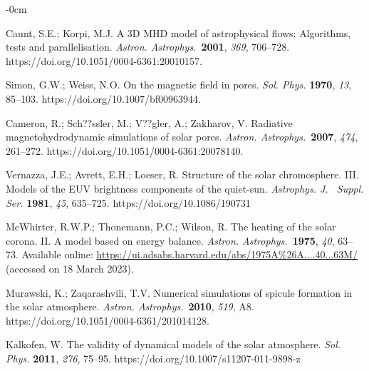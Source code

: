 \documentclass[physics,article,accept,pdftex,moreauthors]{Definitions/mdpi}
\newcommand{\aap}{{\it Astron. Astrophys.}}
\begin{document}
\begin{adjustwidth}{-\extralength}{0cm}
\begin{thebibliography}{999}
		Caunt, S.E.; Korpi, M.J. A 3D MHD model of astrophysical flows: Algorithms, tests and parallelisation. \aap~\textbf{2001}, \emph{369}, 706--728. https://doi.org/10.1051/0004-6361:20010157.
		
		Simon, G.W.; Weiss, N.O. On the magnetic field in pores. \emph{Sol. Phys.} \textbf{1970}, \emph{13}, 85--103. https://doi.org/10.1007/bf00963944.
		
		Cameron, R.; Sch??ssler, M.; V??gler, A.; Zakharov, V. Radiative magnetohydrodynamic simulations of solar pores. \aap~\textbf{2007}, \emph{474}, 261--272. https://doi.org/10.1051/0004-6361:20078140.
		
		Vernazza, J.E.; Avrett, E.H.; Loeser, R. Structure of the solar chromosphere. III. Models of the EUV brightness components of the 
quiet-sun. \emph{Astrophys. J.~ Suppl. Ser.} \textbf{1981}, \emph{45}, 635--725. {https://doi.org/10.1086/190731}

		{McWhirter}, R.W.P.; {Thonemann}, P.C.; {Wilson}, R. {The heating of
			the solar corona. II. A model based on energy balance}. \aap~\textbf{1975}, \emph{40}, 63--73.
		{Available online:} \url{https://ui.adsabs.harvard.edu/abs/1975A%26A....40...63M/} (accessed on 18 March 2023).
		
		
		
		
		Murawski, K.; Zaqarashvili, T.V. Numerical simulations of spicule formation in the solar atmosphere. \aap~\textbf{2010}, \emph{519}, 
 {A8.} %
https://doi.org/10.1051/0004-6361/201014128.
		
		
		Kalkofen, W. The validity of dynamical models of the solar atmosphere. \emph{Sol. Phys.} \textbf{2011}, \emph{276}, 75--95.
 {https://doi.org/10.1007/s11207-011-9898-z} 		


\end{thebibliography}
\end{adjustwidth}
\end{document}
